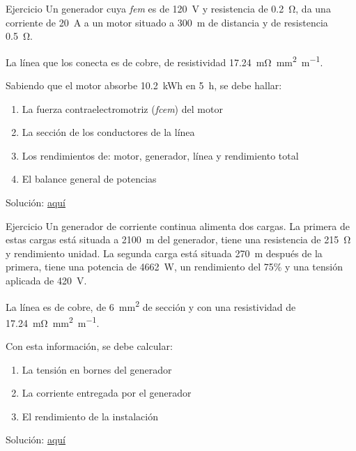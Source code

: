 \documentclass[aspectratio=169, xcolor={usenames,svgnames,dvipsnames}]{beamer}
\begin{document}
\begin{frame}{Ejercicio}
    \vspace{5mm}
    Un generador cuya \textit{fem} es de \qty{120}{\volt} y resistencia de \qty{0.2}{\ohm}, da una corriente de \qty{20}{\ampere} a un motor situado a \qty{300}{\meter} de distancia y de resistencia \qty{0.5}{\ohm}. 
    
    La línea que los conecta es de cobre, de resistividad \qty{17.24}{\milli\ohm\milli\meter\squared\per\meter}. 
    
    Sabiendo que el motor absorbe \qty{10.2}{\kWh} en \qty{5}{\hour}, se debe hallar:
    \vspace{3mm}
    
    \begin{enumerate}
        \item La fuerza contraelectromotriz (\textit{fcem}) del motor
        \item La sección de los conductores de la línea
        \item Los rendimientos de: motor, generador, línea y rendimiento total
        \item El balance general de potencias
    \end{enumerate}
    \vspace{5mm}
    \alert{Solución}: \href{https://raw.githubusercontent.com/ETSIDI-IE/tc/master/docs/ejercicios_clase/TC1_01_Ejercicio_clase_LBB.pdf}{aquí}
\end{frame}


\begin{frame}{Ejercicio}
    \vspace{5mm}
    Un generador de corriente continua alimenta dos cargas. La primera de estas cargas está situada a \qty{2100}{\meter} del generador, tiene una resistencia de \qty{215}{\ohm} y rendimiento unidad. La segunda carga está situada \qty{270}{\meter} después de la primera, tiene una potencia de \qty{4662}{\watt}, un rendimiento del 75\% y una tensión aplicada de \qty{420}{\volt}.

    La línea es de cobre, de \qty{6}{\milli\meter\squared} de sección y con una resistividad de \qty{17.24}{\milli\ohm\milli\meter\squared\per\meter}.
    
    \vspace{4mm}
    
    Con esta información, se debe calcular:
    
    \vspace{1mm}
    
    \begin{enumerate}
        \item La tensión en bornes del generador
        \item La corriente entregada por el generador
        \item El rendimiento de la instalación
    \end{enumerate}
    \vspace{5mm}
    \alert{Solución}: \href{https://raw.githubusercontent.com/ETSIDI-IE/tc/master/docs/ejercicios_clase/TC1_01_Ejercicio_clase2_LBB.pdf}{aquí}
\end{frame}
\end{document}
